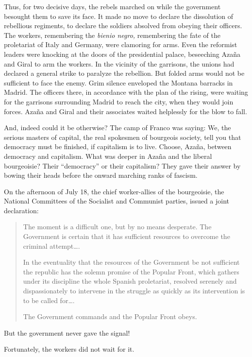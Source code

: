 \indexMAzana\indexJGiral
Thus, for two decisive days, the rebels marched on while the government besought them to save its face. It made no move to declare the dissolution of rebellious regiments, to declare the soldiers absolved from obeying their officers. The workers, remembering the \emph{bienio negro,} remembering the fate of the proletariat of Italy and Germany, were clamoring for arms. Even the reformist leaders were knocking at the doors of the presidential palace, beseeching Azaña and Giral to arm the workers. In the vicinity of the garrisons, the unions had declared a general strike to paralyze the rebellion. But folded arms would not be sufficient to face the enemy. Grim silence enveloped the Montana barracks in Madrid. The officers there, in accordance with the plan of the rising, were waiting for the garrisons surrounding Madrid to reach the city, when they would join forces. Azaña and Giral and their associates waited helplessly for the blow to fall.

And, indeed could it be otherwise? The camp of Franco was saying: We, the serious masters of capital, the real spokesmen of bourgeois society, tell you that democracy must be finished, if capitalism is to live. Choose, Azaña, between democracy and capitalism. What was deeper in Azaña and the liberal bourgeoisie? Their ``democracy'' or their capitalism? They gave their answer by bowing their heads before the onward marching ranks of fascism.

\indexPCE\indexPSOE
On the afternoon of July 18, the chief worker-allies of the bourgeoisie, the National Committees of the Socialist and Communist parties, issued a joint declaration:

\begin{quotation}
  The moment is a difficult one, but by no means desperate. The Government is certain that it has sufficient resources to overcome the criminal attempt\dots.
  
  In the eventuality that the resources of the Government be not sufficient the republic has the solemn promise of the Popular Front, which gathers under its discipline the whole Spanish proletariat, resolved serenely and dispassionately to intervene in the struggle as quickly as its intervention is to be called for\dots.
  
  The Government commands and the Popular Front obeys.
\end{quotation}

But the government never gave the signal!

Fortunately, the workers did not wait for it.